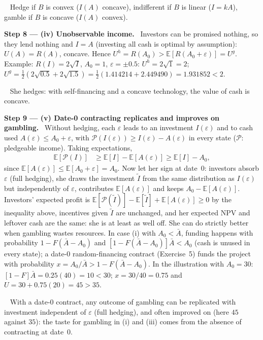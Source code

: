 \documentclass[11pt,a4paper]{article}
\newcommand{\step}[2]{\par\medskip\noindent\textbf{Step #1 --- #2.}~}
\newcommand{\answer}[1]{\par\smallskip\noindent\fbox{\textbf{Answer #1.}}~}
\begin{document}
\answer{(iii)} Hedge if $B$ is convex ($I(A)$ concave), indifferent if $B$ is linear
($I=kA$), gamble if $B$ is concave ($I(A)$ convex).

\step{8}{(iv) Unobservable income} Investors can be promised nothing, so they lend nothing and
$I=A$ (investing all cash is optimal by assumption): $U(A)=R(A)$, concave. Hence
$U^h=R(A_0)>\mathbb{E}[R(A_0+\varepsilon)]=U^g$. Example: $R(I)=2\sqrt I$, $A_0=1$,
$\varepsilon=\pm0.5$: $U^h=2\sqrt1=2$; $U^g=\tfrac12(2\sqrt{0.5}+2\sqrt{1.5})=\tfrac12(1.414214+2.449490)=1.931852<2$.

\answer{(iv)} She hedges: with self-financing and a concave technology, the value of cash is
concave.

\step{9}{(v) Date-0 contracting replicates and improves on gambling} Without hedging, each
$\varepsilon$ leads to an investment $I(\varepsilon)$ and to cash used $A(\varepsilon)\le A_0+\varepsilon$,
with $\mathcal P(I(\varepsilon))\ge I(\varepsilon)-A(\varepsilon)$ in every state ($\mathcal P$: pledgeable income).
Taking expectations,
\begin{align}
  \mathbb{E}[\mathcal P(I)] &\ge \mathbb{E}[I]-\mathbb{E}[A(\varepsilon)] \ge \mathbb{E}[I]-A_0, \nonumber
\end{align}
since $\mathbb{E}[A(\varepsilon)]\le\mathbb{E}[A_0+\varepsilon]=A_0$. Now let her sign at date~0:
investors absorb $\varepsilon$ (full hedging), she draws the investment $\tilde I$ from the same
distribution as $I(\varepsilon)$ but independently of $\varepsilon$, contributes
$\mathbb{E}[A(\varepsilon)]$ and keeps $A_0-\mathbb{E}[A(\varepsilon)]$. Investors' expected profit is
$\mathbb{E}[\mathcal P(\tilde I)]-\mathbb{E}[\tilde I]+\mathbb{E}[A(\varepsilon)]\ge 0$ by the inequality above,
incentives given $\tilde I$ are unchanged, and her expected NPV and leftover cash are the same: she
is at least as well off. She can do strictly better when gambling wastes resources. In case (i)
with $A_0<\bar A$, funding happens with probability $1-F(\bar A-A_0)$ and
$[1-F(\bar A-A_0)]\bar A<A_0$ (cash is unused in every state); a date-0 random-financing contract
(Exercise~5) funds the project with probability $x=A_0/\bar A>1-F(\bar A-A_0)$. In the
illustration with $A_0=30$: $[1-F]\bar A=0.25(40)=10<30$; $x=30/40=0.75$ and
$U=30+0.75(20)=45>35$.

\answer{(v)} With a date-0 contract, any outcome of gambling can be replicated with investment
independent of $\varepsilon$ (full hedging), and often improved on (here $45$ against $35$): the
taste for gambling in (i) and (iii) comes from the absence of contracting at date~0.
\end{document}
